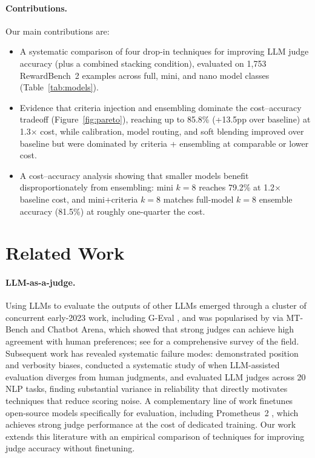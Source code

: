 \documentclass{article}
\begin{document}
\paragraph{Contributions.} Our main contributions are:
\begin{itemize}
  \item A systematic comparison of four drop-in techniques for improving LLM judge accuracy (plus a combined stacking condition), evaluated on 1,753 RewardBench~2 examples across full, mini, and nano model classes (Table~\ref{tab:models}).
  \item Evidence that criteria injection and ensembling dominate the cost--accuracy tradeoff (Figure~\ref{fig:pareto}), reaching up to 85.8\% (+13.5pp over baseline) at 1.3$\times$ cost, while calibration, model routing, and soft blending improved over baseline but were dominated by criteria + ensembling at comparable or lower cost.
  \item A cost--accuracy analysis showing that smaller models benefit disproportionately from ensembling: mini $k{=}8$ reaches 79.2\% at 1.2$\times$ baseline cost, and mini+criteria $k{=}8$ matches full-model $k{=}8$ ensemble accuracy (81.5\%) at roughly one-quarter the cost.
\end{itemize}

\section{Related Work}
\label{sec:related-work}

\paragraph{LLM-as-a-judge.} Using LLMs to evaluate the outputs of other LLMs emerged through a cluster of concurrent early-2023 work, including G-Eval \citep{liu2023geval}, and was popularised by \citet{zheng2023judging} via MT-Bench and Chatbot Arena, which showed that strong judges can achieve high agreement with human preferences; see \citet{gu2024survey} for a comprehensive survey of the field. Subsequent work has revealed systematic failure modes: \citet{wang2024large} demonstrated position and verbosity biases, \citet{shankar2024validates} conducted a systematic study of when LLM-assisted evaluation diverges from human judgments, and \citet{bavaresco2025judgebench} evaluated LLM judges across 20 NLP tasks, finding substantial variance in reliability that directly motivates techniques that reduce scoring noise. A complementary line of work finetunes open-source models specifically for evaluation, including Prometheus~2 \citep{kim2024prometheus}, which achieves strong judge performance at the cost of dedicated training. Our work extends this literature with an empirical comparison of techniques for improving judge accuracy without finetuning.
\end{document}
